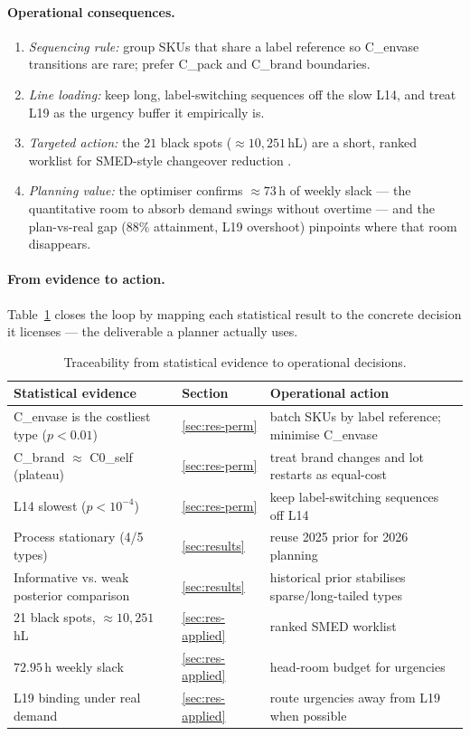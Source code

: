 \documentclass[11pt,a4paper]{article}
\begin{document}
\paragraph{Operational consequences.}
\begin{enumerate}[leftmargin=1.6em,itemsep=1pt]
\item \emph{Sequencing rule:} group SKUs that share a label reference so C\_envase
transitions are rare; prefer C\_pack and C\_brand boundaries.
\item \emph{Line loading:} keep long, label-switching sequences off the slow L14,
and treat L19 as the urgency buffer it empirically is.
\item \emph{Targeted action:} the $21$ black spots ($\approx10{,}251$\,hL) are a
short, ranked worklist for SMED-style changeover reduction \cite{shingo1985smed}.
\item \emph{Planning value:} the optimiser confirms $\approx73$\,h of weekly slack
--- the quantitative room to absorb demand swings without overtime --- and the
plan-vs-real gap ($88\%$ attainment, L19 overshoot) pinpoints where that room
disappears.
\end{enumerate}

\paragraph{From evidence to action.}
Table~\ref{tab:actions} closes the loop by mapping each statistical result to the
concrete decision it licenses --- the deliverable a planner actually uses.

\begin{table}[H]\centering\small
\begin{tabular}{@{}lll@{}}
\toprule
Statistical evidence & Section & Operational action \\
\midrule
C\_envase is the costliest type ($p<0.01$) & \ref{sec:res-perm} & batch SKUs by label reference; minimise C\_envase \\
C\_brand $\approx$ C0\_self (plateau) & \ref{sec:res-perm} & treat brand changes and lot restarts as equal-cost \\
L14 slowest ($p<10^{-4}$) & \ref{sec:res-perm} & keep label-switching sequences off L14 \\
Process stationary (4/5 types) & \ref{sec:results} & reuse 2025 prior for 2026 planning \\
Informative vs. weak posterior comparison & \ref{sec:results} & historical prior stabilises sparse/long-tailed types \\
21 black spots, $\approx10{,}251$\,hL & \ref{sec:res-applied} & ranked SMED worklist \\
$72.95$\,h weekly slack & \ref{sec:res-applied} & head-room budget for urgencies \\
L19 binding under real demand & \ref{sec:res-applied} & route urgencies away from L19 when possible \\
\bottomrule
\end{tabular}
\caption{Traceability from statistical evidence to operational decisions.}
\label{tab:actions}
\end{table}
\end{document}
